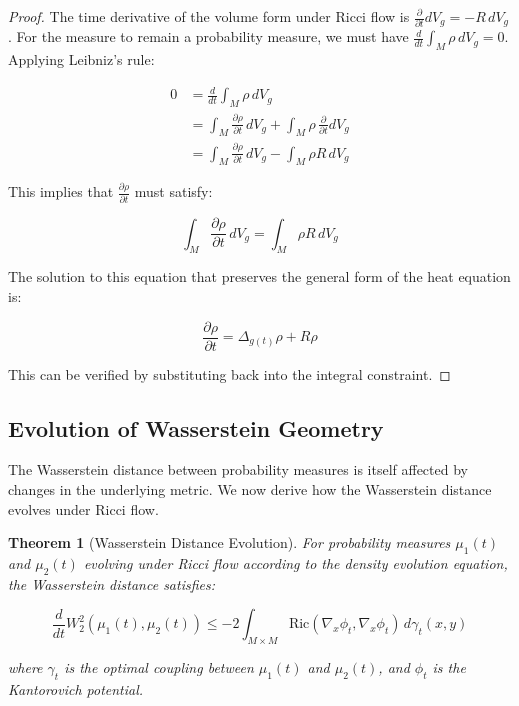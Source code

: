 \documentclass[12pt,a4paper]{article}
\newtheorem{theorem}{Theorem}
\begin{document}
\begin{proof}
The time derivative of the volume form under Ricci flow is $\frac{\partial}{\partial t}dV_g = -R \, dV_g$. For the measure to remain a probability measure, we must have $\frac{d}{dt}\int_M \rho \, dV_g = 0$. Applying Leibniz's rule:

\begin{align}
0 &= \frac{d}{dt}\int_M \rho \, dV_g \\
&= \int_M \frac{\partial \rho}{\partial t} \, dV_g + \int_M \rho \, \frac{\partial}{\partial t}dV_g \\
&= \int_M \frac{\partial \rho}{\partial t} \, dV_g - \int_M \rho R \, dV_g
\end{align}

This implies that $\frac{\partial \rho}{\partial t}$ must satisfy:

\begin{equation}
\int_M \frac{\partial \rho}{\partial t} \, dV_g = \int_M \rho R \, dV_g
\end{equation}

The solution to this equation that preserves the general form of the heat equation is:

\begin{equation}
\frac{\partial \rho}{\partial t} = \Delta_{g(t)} \rho + R \rho
\end{equation}

This can be verified by substituting back into the integral constraint.
\end{proof}

\subsection{Evolution of Wasserstein Geometry}

The Wasserstein distance between probability measures is itself affected by changes in the underlying metric. We now derive how the Wasserstein distance evolves under Ricci flow.

\begin{theorem}[Wasserstein Distance Evolution]
For probability measures $\mu_1(t)$ and $\mu_2(t)$ evolving under Ricci flow according to the density evolution equation, the Wasserstein distance satisfies:

\begin{equation}
\frac{d}{dt}W_2^2(\mu_1(t), \mu_2(t)) \leq -2 \int_{M \times M} \text{Ric}(\nabla_x \phi_t, \nabla_x \phi_t) \, d\gamma_t(x, y)
\end{equation}

\noindent where $\gamma_t$ is the optimal coupling between $\mu_1(t)$ and $\mu_2(t)$, and $\phi_t$ is the Kantorovich potential.
\end{theorem}
\end{document}
